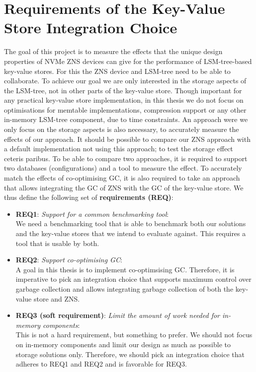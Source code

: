 \section{Requirements of the Key-Value Store Integration Choice}
The goal of this project is to measure the effects that the unique design properties of NVMe ZNS devices can give for the performance of LSM-tree-based key-value stores. For this the ZNS device and LSM-tree need to be able to collaborate. To achieve our goal we are only interested in the storage aspects of the LSM-tree, not in other parts of the key-value store. Though important for any practical key-value store implementation, in this thesis we do not focus on optimisations for memtable implementations, compression support or any other in-memory LSM-tree component, due to time constraints. An approach were we only focus on the storage aspects is also necessary, to accurately measure the effects of our approach. It should be possible to compare our ZNS approach with a default implementation not using this approach; to test the storage effect ceteris paribus. To be able to compare two approaches, it is required to support two databases (configurations) and a tool to measure the effect. To accurately match the effects of co-optimising GC, it is also required to take an approach that allows integrating the GC of ZNS with the GC of the key-value store. We thus define the following set of \textbf{requirements (REQ)}:
\begin{itemize}
    \item \textbf{REQ1}: \textit{Support for a common benchmarking tool}:\\
    We need a benchmarking tool that is able to benchmark both our solutions and the key-value stores that we intend to evaluate against. This requires a tool that is usable by both.
    \item \textbf{REQ2}: \textit{Support co-optimising GC}:\\
    A goal in this thesis is to implement co-optimsising GC. Therefore, it is imperative to pick an integration choice that supports maximum control over garbage collection and allows integrating garbage collection of both the key-value store and ZNS.
    \item \textbf{REQ3 (soft requirement)}: \textit{Limit the amount of work needed for in-memory components}:\\
    This is not a hard requirement, but something to prefer. We should not focus on in-memory components and limit our design as much as possible to storage solutions only. Therefore, we should pick an integration choice that adheres to REQ1 and REQ2 and is favorable for REQ3. 
\end{itemize}


